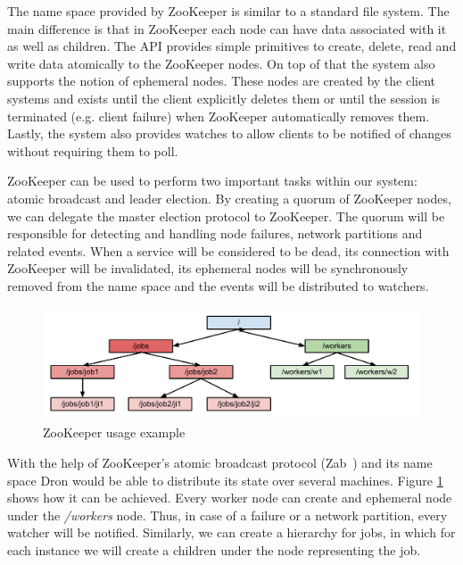\documentclass[11pt,a4paper,twoside]{report}
\begin{document}
The name space provided by ZooKeeper is similar to a standard file system. The main difference is that in ZooKeeper each node can have data associated with it as well as children. The API provides simple primitives to create, delete, read and write data atomically to the ZooKeeper nodes. On top of that the system also supports the notion of ephemeral nodes. These nodes are created by the client systems and exists until the client explicitly deletes them or until the session is terminated (e.g. client failure) when ZooKeeper automatically removes them. Lastly, the system also provides watches to allow clients to be notified of changes without requiring them to poll.


ZooKeeper can be used to perform two important tasks within our system: atomic broadcast and leader election. By creating a quorum of ZooKeeper nodes, we can delegate the master election protocol to ZooKeeper. The quorum will be responsible for detecting and handling node failures, network partitions and related events. When a service will be considered to be dead, its connection with ZooKeeper will be invalidated, its ephemeral nodes will be synchronously removed from the name space and the events will be distributed to watchers.


\begin{figure}[h]
\centering
\includegraphics[scale=0.65]{ZooKeeper}
\caption{ZooKeeper usage example}
\label{fig:ZooKeeper}
\end{figure}

With the help of ZooKeeper's atomic broadcast protocol (Zab~\cite{Zab}) and its name space Dron would be able to distribute its state over several machines. Figure \ref{fig:ZooKeeper} shows how it can be achieved. Every worker node can create and ephemeral node under the \textit{/workers} node. Thus, in case of a failure or a network partition, every watcher will be notified. Similarly, we can create a hierarchy for jobs, in which for each instance we will create a children under the node representing the job.
\end{document}
